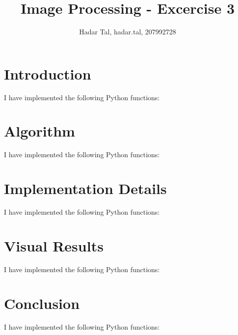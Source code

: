 \documentclass[a4paper, 12pt]{article}
\title{Image Processing - Excercise 3}
\author{Hadar Tal, hadar.tal, 207992728}
\begin{document}
\maketitle

\section*{Introduction}

I have implemented the following Python functions:

\section*{Algorithm}

I have implemented the following Python functions:

\section*{Implementation Details}

I have implemented the following Python functions:

\section*{Visual Results}

I have implemented the following Python functions:

\section*{Conclusion}

I have implemented the following Python functions:
\end{document}
